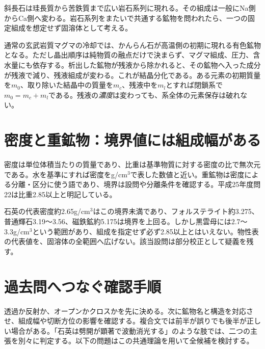 斜長石は珪長質から苦鉄質まで広い岩石系列に現れる。その組成は一般にNa側からCa側へ変わる。岩石系列をまたいで共通する鉱物を問われたら、一つの固定組成を想定せず固溶体として考える。

通常の玄武岩質マグマの冷却では、かんらん石が高温側の初期に現れる有色鉱物となる。ただし晶出順序は純物質の融点だけで決まらず、マグマ組成、圧力、含水量にも依存する。析出した鉱物が残液から除かれると、その鉱物へ入った成分が残液で減り、残液組成が変わる。これが結晶分化である。ある元素の初期質量を$m_0$、取り除いた結晶中の質量を$m_c$、残液中を$m_l$とすれば閉鎖系で$m_0=m_c+m_l$である。残液の\emph{濃度}は変わっても、系全体の元素保存は破れない。

\section{密度と重鉱物：境界値には組成幅がある}
\label{theory:mineral:density}
密度は単位体積当たりの質量であり、比重は基準物質に対する密度の比で無次元である。水を基準にすれば密度をg/cm$^3$で表した数値と近い。重鉱物は密度による分離・区分に使う語であり、境界は設問や分離条件を確認する。平成25年度問22は比重2.85以上と明記している。

石英の代表密度約2.65g/cm$^3$はこの境界未満であり、フォルステライト約3.275、普通輝石3.19〜3.56、磁鉄鉱約5.175は境界を上回る\parencite{hom_quartz,hom_forsterite,hom_augite,hom_magnetite}。しかし黒雲母には2.7〜3.3g/cm$^3$という範囲があり\parencite{hom_biotite}、組成を指定せず必ず2.85以上とはいえない。物性表の代表値を、固溶体の全範囲へ広げない。該当設問は部分校正として疑義を残す。

\section{過去問へつなぐ確認手順}
透過か反射か、オープンかクロスかを先に決める。次に鉱物名と構造を対応させ、組成幅や切断方位の影響を確認する。複合文では前半が誤りでも後半が正しい場合がある。「石英は劈開が顕著で波動消光する」のような肢では、二つの主張を別々に判定する。以下の問題はこの共通理論を用いて全候補を検討する。

